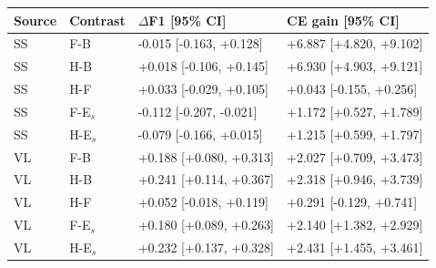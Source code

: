 \begin{tabular}{llll}
\toprule
Source & Contrast & $\Delta$F1 [95\% CI] & CE gain [95\% CI] \\
\midrule
SS & F-B & -0.015 [-0.163, +0.128] & +6.887 [+4.820, +9.102] \\
SS & H-B & +0.018 [-0.106, +0.145] & +6.930 [+4.903, +9.121] \\
SS & H-F & +0.033 [-0.029, +0.105] & +0.043 [-0.155, +0.256] \\
SS & F-E$_s$ & -0.112 [-0.207, -0.021] & +1.172 [+0.527, +1.789] \\
SS & H-E$_s$ & -0.079 [-0.166, +0.015] & +1.215 [+0.599, +1.797] \\
VL & F-B & +0.188 [+0.080, +0.313] & +2.027 [+0.709, +3.473] \\
VL & H-B & +0.241 [+0.114, +0.367] & +2.318 [+0.946, +3.739] \\
VL & H-F & +0.052 [-0.018, +0.119] & +0.291 [-0.129, +0.741] \\
VL & F-E$_s$ & +0.180 [+0.089, +0.263] & +2.140 [+1.382, +2.929] \\
VL & H-E$_s$ & +0.232 [+0.137, +0.328] & +2.431 [+1.455, +3.461] \\
\bottomrule
\end{tabular}
